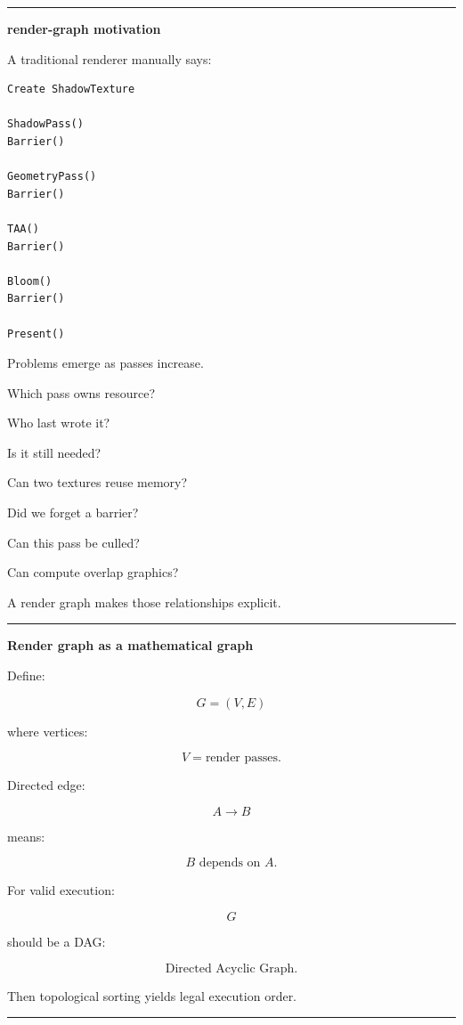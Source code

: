 \begin{center}\rule{0.5\linewidth}{0.5pt}\end{center}

\textbf{render-graph motivation}

A traditional renderer manually says:

\begin{verbatim}
Create ShadowTexture

ShadowPass()
Barrier()

GeometryPass()
Barrier()

TAA()
Barrier()

Bloom()
Barrier()

Present()
\end{verbatim}

Problems emerge as passes increase.

Which pass owns resource?

Who last wrote it?

Is it still needed?

Can two textures reuse memory?

Did we forget a barrier?

Can this pass be culled?

Can compute overlap graphics?

A render graph makes those relationships explicit.

\begin{center}\rule{0.5\linewidth}{0.5pt}\end{center}

\textbf{Render graph as a mathematical graph}

Define:

\[
G=(V,E)
\]

where vertices:

\[
V=
\text{render passes}.
\]

Directed edge:

\[
A\rightarrow B
\]

means:

\[
\boxed{
B\text{ depends on }A.
}
\]

For valid execution:

\[
G
\]

should be a DAG:

\[
\boxed{
\text{Directed Acyclic Graph}.
}
\]

Then topological sorting yields legal execution order.

\begin{center}\rule{0.5\linewidth}{0.5pt}\end{center}

